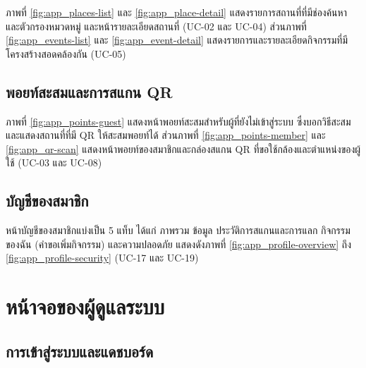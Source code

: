 ภาพที่ \ref{fig:app_places-list} และ \ref{fig:app_place-detail} แสดงรายการสถานที่ที่มีช่องค้นหาและตัวกรองหมวดหมู่ และหน้ารายละเอียดสถานที่ (UC-02 และ UC-04) ส่วนภาพที่ \ref{fig:app_events-list} และ \ref{fig:app_event-detail} แสดงรายการและรายละเอียดกิจกรรมที่มีโครงสร้างสอดคล้องกัน (UC-05)


\subsection{พอยท์สะสมและการสแกน QR}

ภาพที่ \ref{fig:app_points-guest} แสดงหน้าพอยท์สะสมสำหรับผู้ที่ยังไม่เข้าสู่ระบบ ซึ่งบอกวิธีสะสมและแสดงสถานที่ที่มี QR ให้สะสมพอยท์ได้ ส่วนภาพที่ \ref{fig:app_points-member} และ \ref{fig:app_qr-scan} แสดงหน้าพอยท์ของสมาชิกและกล่องสแกน QR ที่ขอใช้กล้องและตำแหน่งของผู้ใช้ (UC-03 และ UC-08)


\subsection{บัญชีของสมาชิก}

หน้าบัญชีของสมาชิกแบ่งเป็น 5 แท็บ ได้แก่ ภาพรวม ข้อมูล ประวัติการสแกนและการแลก กิจกรรมของฉัน (คำขอเพิ่มกิจกรรม) และความปลอดภัย แสดงดังภาพที่ \ref{fig:app_profile-overview} ถึง \ref{fig:app_profile-security} (UC-17 และ UC-19)


\section{หน้าจอของผู้ดูแลระบบ}

\subsection{การเข้าสู่ระบบและแดชบอร์ด}

